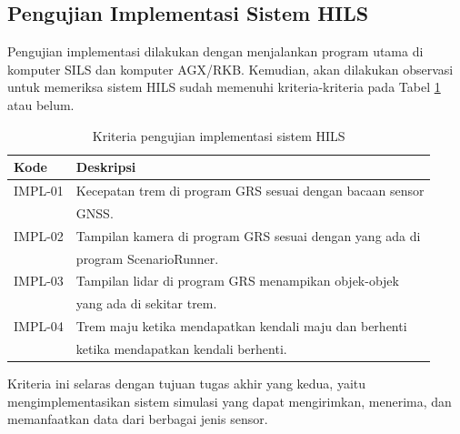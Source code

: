 \subsection{Pengujian Implementasi Sistem HILS}

Pengujian implementasi dilakukan dengan menjalankan program utama di komputer
SILS dan komputer AGX/RKB. Kemudian, akan dilakukan observasi untuk memeriksa
sistem HILS sudah memenuhi kriteria-kriteria pada Tabel
\ref{chapter-4-tbl-impl-criteria} atau belum.

\begin{table}[!htbp]
	\begin{center}
		\begin{tabular}{|l|l|}
			\hline
			\textbf{Kode} & \textbf{Deskripsi}                                     \\
			\hline
			IMPL-01       & Kecepatan trem di program GRS sesuai dengan bacaan
			sensor                                                                 \\
			              & GNSS.                                                  \\
			\hline
			IMPL-02       & Tampilan kamera di program GRS sesuai dengan yang
			ada di                                                                 \\
			              & program ScenarioRunner.                                \\
			\hline
			IMPL-03       & Tampilan lidar di program GRS menampikan
			objek-objek                                                            \\
			              & yang ada di sekitar trem.                              \\
			\hline
			IMPL-04       & Trem maju ketika mendapatkan kendali maju dan berhenti \\
			              & ketika mendapatkan kendali berhenti.                   \\
			\hline
		\end{tabular}
	\end{center}

	\caption{Kriteria pengujian implementasi sistem HILS}
	\label{chapter-4-tbl-impl-criteria}
\end{table}

Kriteria ini selaras dengan tujuan tugas akhir yang kedua, yaitu
mengimplementasikan sistem simulasi yang dapat mengirimkan, menerima, dan
memanfaatkan data dari berbagai jenis sensor.

